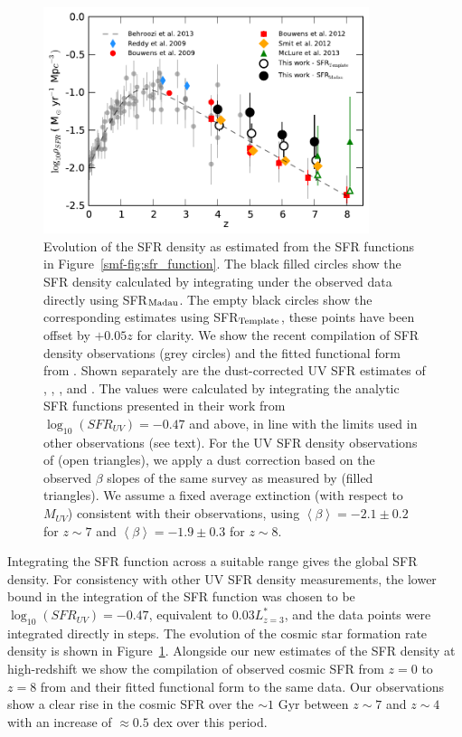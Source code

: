 \begin{figure}
\centering
\includegraphics[width=0.85\textwidth]{plots/fig15.pdf}
\caption[Evolution of the SFR density as estimated from the SFR functions in Figure~\ref{smf-fig:sfr_function}.]{Evolution of the SFR density as estimated from the SFR functions in Figure~\ref{smf-fig:sfr_function}. The black filled circles show the SFR density calculated by integrating under the observed data directly using SFR$_{\rm{Madau}}$. The empty black circles show the corresponding estimates using SFR$_{\rm{Template}}$, these points have been offset by $+0.05 z$ for clarity. We show the recent compilation of SFR density observations (grey circles) and the fitted functional form from \citet{Behroozi:2013fg}. Shown separately are the dust-corrected UV SFR estimates of \citet{Anonymous:r_woy2UF}, \citet{Bouwens:2009ik}, \citet{2012ApJ...754...83B},  \citet{Smit:2012is} and \citet{McLure:2013hh}. The \citet{Smit:2012is} values were calculated by integrating the analytic SFR functions presented in their work from $\log_{10}(SFR_{UV}) = -0.47$ and above, in line with the limits used in other observations (see text). For the UV SFR density observations of \citet{McLure:2013hh} (open triangles), we apply a dust correction based on the observed $\beta$ slopes of the same survey as measured by \citet{Dunlop:2013kp} (filled triangles). We assume a fixed average extinction (with respect to $M_{UV}$) consistent with their observations, using $\left \langle \beta \right \rangle = -2.1 \pm 0.2$ for $z \sim 7$ and $\left \langle \beta \right \rangle = -1.9 \pm 0.3$ for $z \sim 8$.}
\label{smf-fig:sfr_density}
\end{figure}

Integrating the SFR function across a suitable range gives the global SFR density. For consistency with other UV SFR density measurements, the lower bound in the integration of the SFR function was chosen to be $\log_{10}(SFR_{UV}) = -0.47$, equivalent to $0.03 L^{*}_{z=3}$, and the data points were integrated directly in steps. The evolution of the cosmic star formation rate density is shown in Figure~\ref{smf-fig:sfr_density}. Alongside our new estimates of the SFR density at high-redshift we show the compilation of observed cosmic SFR from $z=0$ to $z=8$ from \citet{Behroozi:2013fg} and their fitted functional form to the same data. Our observations show a clear rise in the cosmic SFR over the $\sim 1$ Gyr between $z\sim7$ and $z\sim4$ with an increase of $\approx 0.5$ dex over this period.


